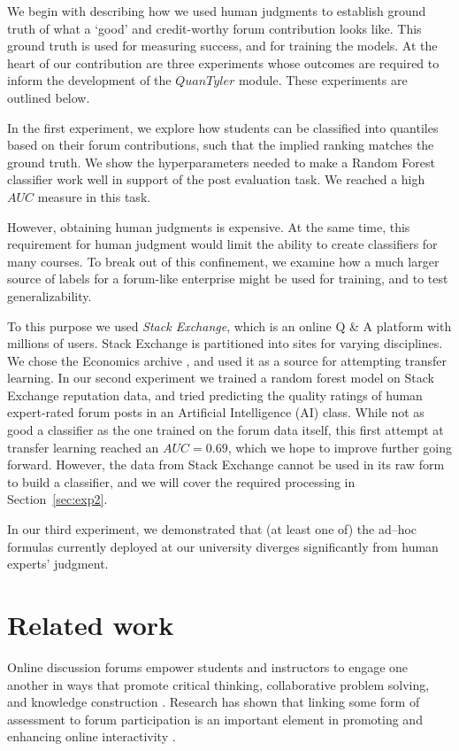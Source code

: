 We begin with describing how we used human judgments to establish ground truth of what a
`good' and credit-worthy forum contribution looks like. This ground truth is used for measuring success, and for training the models. At the heart of our contribution are three experiments whose outcomes
are required to inform the development of the $QuanTyler$ module. These experiments are outlined below.

In the first experiment, we explore how students can be classified
into quantiles based on their forum contributions, such that the
implied ranking matches the ground truth. We show the hyperparameters
needed to make a Random Forest classifier work well in support of the
post evaluation task. We reached a high $AUC$ measure in this task.

However, obtaining human judgments is expensive. At the same time,
this requirement for human judgment would limit the ability to create
classifiers for many courses. To break out of this confinement, we
examine how a much larger source of labels for a forum-like enterprise
might be used for training, and to test generalizability.

To this purpose we used \emph{Stack Exchange}, \cite{stackex} which is an online Q \& A platform with millions of users. Stack Exchange is partitioned into sites for varying disciplines. We
chose the Economics archive \cite{stackexEcon}, and used it as a source for
attempting transfer learning. In our second experiment we trained a
random forest model on Stack Exchange reputation data, and tried
predicting the quality ratings of human expert-rated forum posts in an Artificial
Intelligence (AI) class. While not as good a classifier as the one
trained on the forum data itself, this first attempt at transfer
learning reached an $AUC = 0.69$, which we hope to improve further going
forward. However, the data from Stack Exchange cannot be used in
its raw form to build a classifier, and we will cover the required
processing in Section~\ref{sec:exp2}.

In our third experiment, we demonstrated that (at least one
of) the ad--hoc formulas currently deployed at our university diverges significantly from human experts' judgment.

\section{Related work}

Online discussion forums empower students and instructors to engage
one another in ways that promote critical thinking, collaborative
problem solving, and knowledge construction
\cite{pendry2015individual, marra2004content}. Research has
shown that linking some form of assessment to forum participation is an
important element in promoting and enhancing online
interactivity \cite{laurillard2013rethinking, yeh2005use}. 


